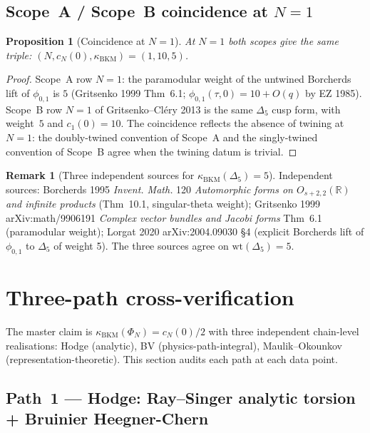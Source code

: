 \documentclass[11pt]{article}
\providecommand{\kBKM}{\kappa_{\mathrm{BKM}}}
\newtheorem{proposition}[lemma]{Proposition}
\theoremstyle{definition}
\newtheorem{remark}[lemma]{Remark}
\begin{document}
\subsection{Scope~A / Scope~B coincidence at $N = 1$}
\label{sec:scope-A-B-N-1}

\begin{proposition}[Coincidence at $N = 1$]
\label{prop:scope-a-b-n-1-coincidence}
At $N = 1$ both scopes give the same triple:
$(N, c_N(0), \kBKM) = (1, 10, 5)$.
\end{proposition}

\begin{proof}
Scope~A row $N = 1$: the paramodular weight of the untwined
Borcherds lift of $\phi_{0,1}$ is $5$ (Gritsenko 1999 Thm~6.1;
$\phi_{0,1}(\tau, 0) = 10 + O(q)$ by EZ 1985). Scope~B row $N = 1$ of
Gritsenko--Cl\'ery 2013 is the same $\Delta_5$ cusp form, with
weight~$5$ and $c_1(0) = 10$. The coincidence reflects the absence of
twining at $N = 1$: the doubly-twined convention of Scope~A and the
singly-twined convention of Scope~B agree when the twining datum is
trivial.
\end{proof}

\begin{remark}[Three independent sources for
$\kBKM(\Delta_5) = 5$]
Independent sources: Borcherds 1995 \emph{Invent. Math.} 120
\emph{Automorphic forms on $O_{s+2,2}(\mathbb R)$ and infinite products}
(Thm~10.1, singular-theta weight); Gritsenko 1999
arXiv:math/9906191 \emph{Complex vector bundles and Jacobi forms}
Thm~6.1 (paramodular weight); Lorgat 2020 arXiv:2004.09030 \S 4
(explicit Borcherds lift of $\phi_{0,1}$ to $\Delta_5$ of weight 5).
The three sources agree on $\mathrm{wt}(\Delta_5) = 5$.
\end{remark}

\section{Three-path cross-verification}
\label{sec:three-path}

The master claim is $\kBKM(\Phi_N) = c_N(0)/2$ with three independent
chain-level realisations: Hodge (analytic), BV (physics-path-integral),
Maulik--Okounkov (representation-theoretic). This section audits each
path at each data point.

\subsection{Path~1 --- Hodge: Ray--Singer analytic torsion + Bruinier
Heegner-Chern}
\end{document}
